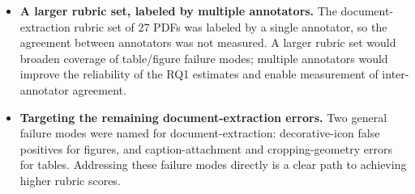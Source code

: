 \begin{itemize}[label={},leftmargin=1.5em]
    \item \textbf{A larger rubric set, labeled by multiple annotators.} The document-extraction rubric set of 27 PDFs was labeled by a single annotator, so the agreement between annotators was not measured. A larger rubric set would broaden coverage of table/figure failure modes; multiple annotators would improve the reliability of the RQ1 estimates and enable measurement of inter-annotator agreement. 

    \item \textbf{Targeting the remaining document-extraction errors.} Two general failure modes were named for document-extraction: decorative-icon false positives for figures, and caption-attachment and cropping-geometry errors for tables. Addressing these failure modes directly is a clear path to achieving higher rubric scores. 
\end{itemize}